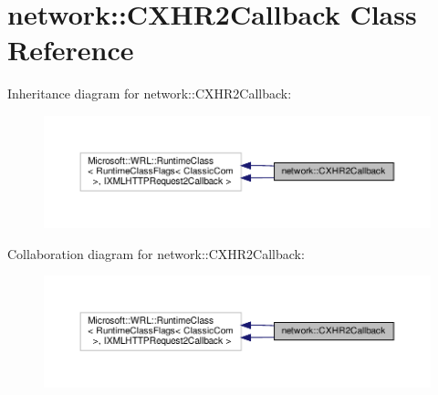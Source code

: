 \hypertarget{classnetwork_1_1CXHR2Callback}{}\section{network\+:\+:C\+X\+H\+R2\+Callback Class Reference}
\label{classnetwork_1_1CXHR2Callback}


Inheritance diagram for network\+:\+:C\+X\+H\+R2\+Callback\+:
\nopagebreak
\begin{figure}[H]
\begin{center}
\leavevmode
\includegraphics[width=350pt]{classnetwork_1_1CXHR2Callback__inherit__graph}
\end{center}
\end{figure}


Collaboration diagram for network\+:\+:C\+X\+H\+R2\+Callback\+:
\nopagebreak
\begin{figure}[H]
\begin{center}
\leavevmode
\includegraphics[width=350pt]{classnetwork_1_1CXHR2Callback__coll__graph}
\end{center}
\end{figure}
